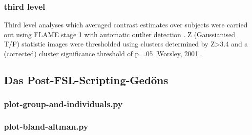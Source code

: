 \documentclass[english]{article}
\begin{document}
\subsubsection{third level}
Third level analyses which averaged contrast estimates over subjects were carried out using FLAME stage 1 with automatic outlier detection \citep{beckmann2003general, woolrich2004multilevel, woolrich2008robust}. Z (Gaussianised T/F) statistic images were thresholded using clusters determined by Z>3.4 and a (corrected) cluster significance threshold of p=.05 [Worsley, 2001].

\subsection{Das Post-FSL-Scripting-Gedöns}
\subsubsection{plot-group-and-individuals.py}

\subsubsection{plot-bland-altman.py}
\end{document}
